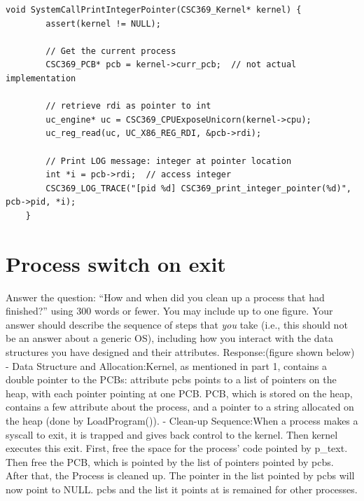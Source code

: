 \documentclass[parskip=half]{scrarticle}
\begin{document}
    \begin{lstlisting}[caption=Kernel Code System Call Handler, label=l:kernelspace]
    void SystemCallPrintIntegerPointer(CSC369_Kernel* kernel) {
        assert(kernel != NULL);
        
        // Get the current process
        CSC369_PCB* pcb = kernel->curr_pcb;  // not actual implementation
        
        // retrieve rdi as pointer to int
        uc_engine* uc = CSC369_CPUExposeUnicorn(kernel->cpu);
        uc_reg_read(uc, UC_X86_REG_RDI, &pcb->rdi);
        
        // Print LOG message: integer at pointer location
        int *i = pcb->rdi;  // access integer
        CSC369_LOG_TRACE("[pid %d] CSC369_print_integer_pointer(%d)", pcb->pid, *i);
    }
    \end{lstlisting}

\newpage

\section{Process switch on exit}

Answer the question:
``How and when did you clean up a process that had finished?''
using 300 words or fewer.
You may include up to one figure.
Your answer should describe the sequence of steps that \textit{you} take (i.e., this should not be an answer about a generic OS), including how you interact with the data structures you have designed and their attributes.
\newline\newline\newline
Response:(figure shown below)\newline
 - Data Structure and Allocation:\newline Kernel, as mentioned in part 1, contains a double pointer to the PCBs: attribute pcbs points to a list of pointers on the heap, with each pointer pointing at one PCB. PCB, which is stored on the heap, contains a few attribute about the process, and a pointer to a string allocated on the heap (done by LoadProgram()). \newline
 - Clean-up Sequence:\newline When a process makes a syscall to exit, it is trapped and gives back control to the kernel. Then kernel executes this exit. First, free the space for the process’ code pointed by p\_text. Then free the PCB, which is pointed by the list of pointers pointed by pcbs. After that, the Process is cleaned up. The pointer in the list pointed by pcbs will now point to NULL. pcbs and the list it points at is remained for other processes.\newline
\end{document}
